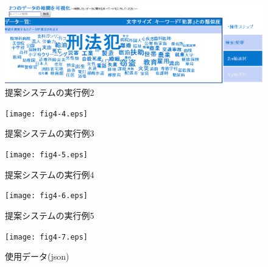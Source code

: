 \documentclass[sotsuron]{kuee}
\begin{document}
\begin{figure}
  \begin{center}
    \unitlength=1mm
   \includegraphics[width=120mm]{fig4-3.eps}
  \end{center}
  \caption{提案システムの実行例2}
  \label{4-3}
\end{figure}

\begin{figure}
  \begin{center}
    \unitlength=1mm
   \texttt{[image: fig4-4.eps]}
  \end{center}
  \caption{提案システムの実行例3}
  \label{4-4}
\end{figure}

\begin{figure}
  \begin{center}
    \unitlength=1mm
   \texttt{[image: fig4-5.eps]}
  \end{center}
  \caption{提案システムの実行例4}
  \label{4-5}
\end{figure}

\begin{figure}
  \begin{center}
    \unitlength=1mm
   \texttt{[image: fig4-6.eps]}
  \end{center}
  \caption{提案システムの実行例5}
  \label{4-6}
\end{figure}

\begin{figure}
  \begin{center}
    \unitlength=1mm
   \texttt{[image: fig4-7.eps]}
  \end{center}
  \caption{使用データ(json)}
  \label{4-7}
\end{figure}
\end{document}
